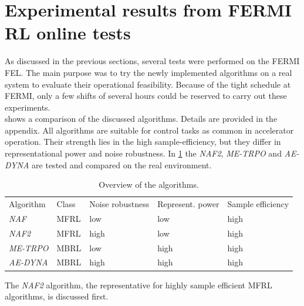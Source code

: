 \documentclass[
reprint,
amsmath,amssymb,amsfonts,clevref,
aps,
prstab,
]{revtex4-2}
\begin{document}
	\section{Experimental results from FERMI RL online tests}\label{sec:Experimental results from FERMI RL online tests}
	As discussed in the previous sections, several tests were performed on the FERMI FEL.
	The main purpose was to try the newly implemented algorithms on a real system to evaluate their operational feasibility. 
	Because of the tight schedule at FERMI, only a few shifts of several hours could be reserved to carry out these experiments.\\ 
	 shows a comparison of the discussed algorithms. Details are provided in the appendix. All algorithms are suitable for control tasks as common in accelerator operation. Their strength lies in the high sample-efficiency, but they differ in representational power and noise robustness. In \cref{sec:Experimental results from FERMI RL online tests} the \emph{NAF2},
	\emph{ME-TRPO} and \emph{AE-DYNA} are tested and compared on the real environment.
	\begin{table}[h!]%
		\caption{\label{tab:overview_algorithms}%
			Overview of the algorithms.
		}
		\begin{ruledtabular}
			\begin{tabular}{l p{1.5cm}p{1.5cm}p{1.5cm}p{1.5cm}}
				\textrm{Algorithm}&
				\textrm{Class}&
				\textrm{Noise \newline robustness}&
				\textrm{Represent. power}&
				\textrm{Sample \newline efficiency}\\
				\colrule
				\emph{NAF} & MFRL & low &low &high\\
				\emph{NAF2} &MFRL & high &low& high\\
				\emph{ME-TRPO} & MBRL & low& high& high\\
				\emph{AE-DYNA} & MBRL & high& high& high\\
			\end{tabular}
		\end{ruledtabular}
	\end{table}
	The \emph{NAF2} algorithm, the representative for highly sample efficient MFRL algorithms, is discussed first.
\end{document}

